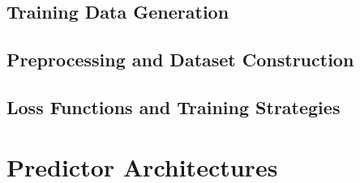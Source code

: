 \subsection{Training Data Generation}

%
%
%


\subsection{Preprocessing and Dataset Construction}

%
%
%


\subsection{Loss Functions and Training Strategies}

%
%


\section{Predictor Architectures}
\label{sec:predictor_architectures}

